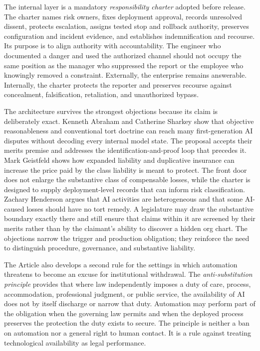 The internal layer is a mandatory \emph{responsibility charter} adopted before release. The charter names risk owners, fixes deployment approval, records unresolved dissent, protects escalation, assigns tested stop and rollback authority, preserves configuration and incident evidence, and establishes indemnification and recourse. Its purpose is to align authority with accountability. The engineer who documented a danger and used the authorized channel should not occupy the same position as the manager who suppressed the report or the employee who knowingly removed a constraint. Externally, the enterprise remains answerable. Internally, the charter protects the reporter and preserves recourse against concealment, falsification, retaliation, and unauthorized bypass.

The architecture survives the strongest objections because its claim is deliberately exact. Kenneth Abraham and Catherine Sharkey show that objective reasonableness and conventional tort doctrine can reach many first-generation AI disputes without decoding every internal model state. The proposal accepts their merits premise and addresses the identification-and-proof loop that precedes it. Mark Geistfeld shows how expanded liability and duplicative insurance can increase the price paid by the class liability is meant to protect. The front door does not enlarge the substantive class of compensable losses, while the charter is designed to supply deployment-level records that can inform risk classification. Zachary Henderson argues that AI activities are heterogeneous and that some AI-caused losses should have no tort remedy. A legislature may draw the substantive boundary exactly there and still ensure that claims within it are screened by their merits rather than by the claimant's ability to discover a hidden org chart. The objections narrow the trigger and production obligation; they reinforce the need to distinguish procedure, governance, and substantive liability.

The Article also develops a second rule for the settings in which automation threatens to become an excuse for institutional withdrawal. The \emph{anti-substitution principle} provides that where law independently imposes a duty of care, process, accommodation, professional judgment, or public service, the availability of AI does not by itself discharge or narrow that duty. Automation may perform part of the obligation when the governing law permits and when the deployed process preserves the protection the duty exists to secure. The principle is neither a ban on automation nor a general right to human contact. It is a rule against treating technological availability as legal performance.

